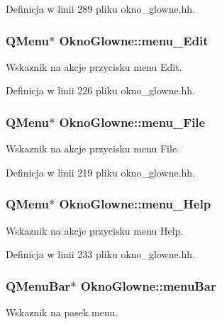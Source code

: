 Definicja w linii 289 pliku okno\-\_\-glowne.\-hh.

\hypertarget{class_okno_glowne_a93afadd0ec22ce6a7e29acc5dd2423a2}{
\subsubsection[{menu\-\_\-\-Edit}]{\setlength{\rightskip}{0pt plus 5cm}Q\-Menu$\ast$ Okno\-Glowne\-::menu\-\_\-\-Edit\hspace{0.3cm}{\ttfamily [private]}}}\label{class_okno_glowne_a93afadd0ec22ce6a7e29acc5dd2423a2}
Wskaznik na akcje przycisku menu Edit. 

Definicja w linii 226 pliku okno\-\_\-glowne.\-hh.

\hypertarget{class_okno_glowne_a1ba162db2d0b06b0f8963e61b3806875}{
\subsubsection[{menu\-\_\-\-File}]{\setlength{\rightskip}{0pt plus 5cm}Q\-Menu$\ast$ Okno\-Glowne\-::menu\-\_\-\-File\hspace{0.3cm}{\ttfamily [private]}}}\label{class_okno_glowne_a1ba162db2d0b06b0f8963e61b3806875}
Wskaznik na akcje przycisku menu File. 

Definicja w linii 219 pliku okno\-\_\-glowne.\-hh.

\hypertarget{class_okno_glowne_ab17be6714913af0cdf4e7de7cb6210d1}{
\subsubsection[{menu\-\_\-\-Help}]{\setlength{\rightskip}{0pt plus 5cm}Q\-Menu$\ast$ Okno\-Glowne\-::menu\-\_\-\-Help\hspace{0.3cm}{\ttfamily [private]}}}\label{class_okno_glowne_ab17be6714913af0cdf4e7de7cb6210d1}
Wskaznik na akcje przycisku menu Help. 

Definicja w linii 233 pliku okno\-\_\-glowne.\-hh.

\hypertarget{class_okno_glowne_a5a87098d9d4bd868670f5a5e72023a0a}{
\subsubsection[{menu\-Bar}]{\setlength{\rightskip}{0pt plus 5cm}Q\-Menu\-Bar$\ast$ Okno\-Glowne\-::menu\-Bar\hspace{0.3cm}{\ttfamily [private]}}}\label{class_okno_glowne_a5a87098d9d4bd868670f5a5e72023a0a}
Wskaznik na pasek menu. 

